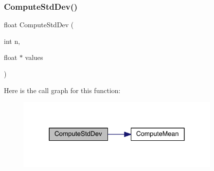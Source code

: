 \subsubsection{\texorpdfstring{Compute\+Std\+Dev()}{ComputeStdDev()}}
{\footnotesize\ttfamily float Compute\+Std\+Dev (\begin{DoxyParamCaption}\item[{int}]{n,  }\item[{float $\ast$}]{values }\end{DoxyParamCaption})}

Here is the call graph for this function\+:\nopagebreak
\begin{figure}[H]
\begin{center}
\leavevmode
\includegraphics[width=288pt]{a00029_a59fad97dedb62ff1ae0722de46318412_cgraph}
\end{center}
\end{figure}
